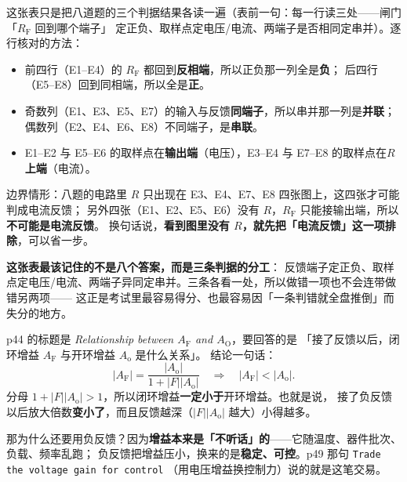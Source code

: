 \documentclass[11pt]{ctexart}
\begin{document}
这张表只是把八道题的三个判据结果各读一遍（表前一句：每一行读三处——闸门「$R_{\mathrm{F}}$ 回到哪个端子」
定正负、取样点定电压/电流、两端子是否相同定串并）。逐行核对的方法：

\begin{itemize}
\item 前四行（E1--E4）的 $R_{\mathrm{F}}$ 都回到\textbf{反相端}，所以正负那一列全是\textbf{负}；
后四行（E5--E8）回到同相端，所以全是\textbf{正}。
\item 奇数列（E1、E3、E5、E7）的输入与反馈\textbf{同端子}，所以串并那一列是\textbf{并联}；
偶数列（E2、E4、E6、E8）不同端子，是\textbf{串联}。
\item E1--E2 与 E5--E6 的取样点在\textbf{输出端}（电压），E3--E4 与 E7--E8 的取样点在\textbf{$R$ 上端}（电流）。
\end{itemize}

边界情形：八题的电路里 $R$ 只出现在 E3、E4、E7、E8 四张图上，这四张才可能判成电流反馈；
另外四张（E1、E2、E5、E6）没有 $R$，$R_{\mathrm{F}}$ 只能接输出端，所以\textbf{不可能是电流反馈}。
换句话说，\textbf{看到图里没有 $R$，就先把「电流反馈」这一项排除}，可以省一步。

\begin{cbox}
\textbf{这张表最该记住的不是八个答案，而是三条判据的分工}：
反馈端子定正负、取样点定电压/电流、两端子异同定串并。三条各看一处，所以做错一项也不会连带做错另两项——
这正是考试里最容易得分、也最容易因「一条判错就全盘推倒」而失分的地方。
\end{cbox}





p44 的标题是 \textit{Relationship between $A_{\mathrm{F}}$ and $A_{\mathrm{O}}$}，要回答的是
「接了反馈以后，闭环增益 $A_{\mathrm{F}}$ 与开环增益 $A_{\mathrm{o}}$ 是什么关系」。
结论一句话：
\[
|A_{\mathrm{F}}|=\frac{|A_{\mathrm{o}}|}{1+|F||A_{\mathrm{o}}|}
\quad\Longrightarrow\quad
|A_{\mathrm{F}}|<|A_{\mathrm{o}}| .
\]
分母 $1+|F||A_{\mathrm{o}}|>1$，所以闭环增益\textbf{一定小于}开环增益。也就是说，
接了负反馈以后放大倍数\textbf{变小了}，而且反馈越深（$|F||A_{\mathrm{o}}|$ 越大）小得越多。

那为什么还要用负反馈？因为\textbf{增益本来是「不听话」的}——它随温度、器件批次、负载、频率乱跑；
负反馈把增益压小，换来的是\textbf{稳定、可控}。p49 那句 \texttt{Trade the voltage gain for control}
（用电压增益换控制力）说的就是这笔交易。
\end{document}
